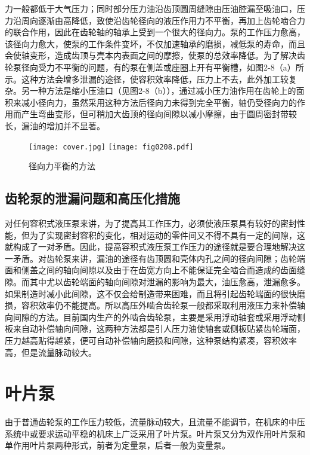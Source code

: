 力一般都低于大气压力；同时部分压力油沿齿顶圆周缝隙由压油腔漏至吸油口，压力沿周向逐渐由高降低，致使沿齿轮径向的液压作用力不平衡，再加上齿轮啮合力的联合作用，因此在齿轮轴的轴承上受到一个很大的径向力。泵的工作压力愈高，该径向力愈大，使泵的工作条件变坏，不仅加速轴承的磨损，减低泵的寿命，而且会使轴变形，造成齿顶与壳本内表面之间的摩擦，使泵的总效率降低。为了解决齿轮泵径向受力不平衡的问题，有的泵在侧盖或座圈上开有平衡槽，如图2-8（a）所示。这种方法会增多泄漏的途径，使容积效率降低，压力上不去，此外加工较复杂。另一种方法是缩小压油口（见图2-8（b）），通过减小压力油作用在齿轮上的面积来减小径向力，虽然采用这种方法后径向力未得到完全平衡，轴仍受径向力的作用而产生弯曲变形，但可稍加大齿顶的径向间隙以减小摩擦，由于圆周密封带较长，漏油的增加并不显著。

\begin{figure}[htbp]
\centering
\ifOpenSource
\texttt{[image: cover.jpg]}
\else
\texttt{[image: fig0208.pdf]}
\fi
\caption{径向力平衡的方法}
\label{fig:fig0208}
\end{figure}

\section{齿轮泵的泄漏问题和高压化措施}

对任何容积式液压泵来讲，为了提高其工作压力，必须使液压泵具有较好的密封性能，但为了实现密封容积的变化，相对运动的零件间又不得不具有一定的间隙，这就构成了一对矛盾。因此，提高容积式液压泵工作压力的途径就是要合理地解决这一矛盾。对齿轮泵来讲，漏油的途径有齿顶圆和壳体内孔之间的径向间隙；齿轮端面和侧盖之间的轴向间隙以及由于在齿宽方向上不能保证完全啮合而造成的齿面缝隙。而其中尤以齿轮端面的轴向间隙对泄漏的影响为最大，油压愈高，泄漏愈多。如果制造时减小此间隙，这不仅会给制造带来困难，而且将引起齿轮端面的很快磨损，容积效率仍不能提高。所以高压外啮合齿轮泵一般都采取利用液压力来补偿轴向间隙的方法。目前国内生产的外啮合齿轮泵，主要是采用浮动轴套或采用浮动侧板来自动补偿轴向间隙，这两种方法都是引人压力油使轴套或侧板贴紧齿轮端面，压力越高贴得越紧，便可自动补偿轴向磨损和间隙，这种泵结构紧凑，容积效率高，但是流量脉动较大。

\chapter{叶片泵}

由于普通齿轮泵的工作压力较低，流量脉动较大，且流量不能调节，在机床的中压系统中或要求运动平稳的机床上广泛采用了叶片泵。叶片泵又分为双作用叶片泵和单作用叶片泵两种形式，前者为定量泵，后者一般为变量泵。

